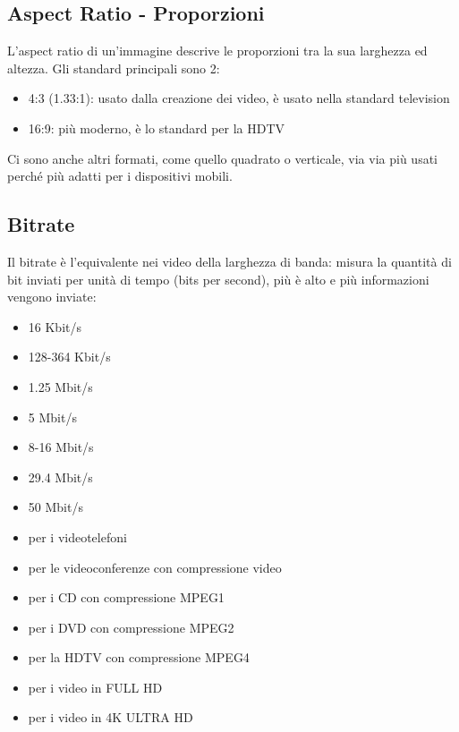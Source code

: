 \documentclass[a4paper,11pt]{article} %
\begin{document}
\subsection{Aspect Ratio - Proporzioni}
L'aspect ratio di un'immagine descrive le proporzioni tra la sua larghezza ed altezza. Gli standard principali sono 2: 
\begin{itemize}
\item 4:3 (1.33:1): usato dalla creazione dei video, è usato nella standard television
\item 16:9: più moderno, è lo standard per la HDTV 
\end{itemize}
Ci sono anche altri formati, come quello quadrato o verticale, via via più usati perché più adatti per i dispositivi mobili.

\subsection{Bitrate}
Il bitrate è l'equivalente nei video della larghezza di banda: misura la quantità di bit inviati per unità di tempo (bits per second), più è alto e più informazioni vengono inviate:\\

\begin{minipage}{0.3\textwidth}
\begin{itemize}
\item 16 Kbit/s
\item 128-364 Kbit/s
\item 1.25 Mbit/s
\item 5 Mbit/s
\item 8-16 Mbit/s
\item 29.4 Mbit/s
\item 50 Mbit/s\\
\end{itemize}
\end{minipage}
\begin{minipage}{0.7\textwidth}
\begin{itemize}[label={}]
\item per i videotelefoni
\item per le videoconferenze con compressione video
\item per i CD con compressione MPEG1
\item per i DVD con compressione MPEG2
\item per la HDTV con compressione MPEG4
\item per i video in FULL HD
\item per i video in 4K ULTRA HD\\
\end{itemize}
\end{minipage}
\end{document}
